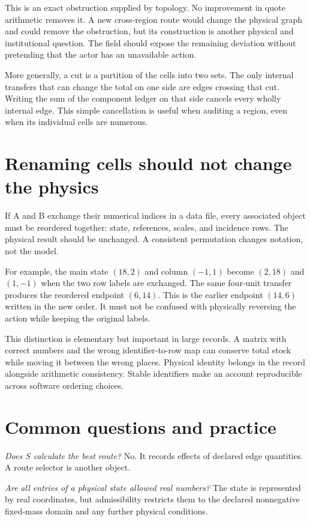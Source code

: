 This is an exact obstruction supplied by topology. No improvement in quote arithmetic removes it. A new cross-region route would change the physical graph and could remove the obstruction, but its construction is another physical and institutional question. The field should expose the remaining deviation without pretending that the actor has an unavailable action.

More generally, a cut is a partition of the cells into two sets. The only internal transfers that can change the total on one side are edges crossing that cut. Writing the sum of the component ledger on that side cancels every wholly internal edge. This simple cancellation is useful when auditing a region, even when its individual cells are numerous.

\section{Renaming cells should not change the physics}
If A and B exchange their numerical indices in a data file, every associated object must be reordered together: state, references, scales, and incidence rows. The physical result should be unchanged. A consistent permutation changes notation, not the model.

For example, the main state \((18,2)\) and column \((-1,1)\) become \((2,18)\) and \((1,-1)\) when the two row labels are exchanged. The same four-unit transfer produces the reordered endpoint \((6,14)\). This is the earlier endpoint \((14,6)\) written in the new order. It must not be confused with physically reversing the action while keeping the original labels.

This distinction is elementary but important in large records. A matrix with correct numbers and the wrong identifier-to-row map can conserve total stock while moving it between the wrong places. Physical identity belongs in the record alongside arithmetic consistency. Stable identifiers make an account reproducible across software ordering choices.

\section{Common questions and practice}
\emph{Does \(S\) calculate the best route?} No. It records effects of declared edge quantities. A route selector is another object.

\emph{Are all entries of a physical state allowed real numbers?} The state is represented by real coordinates, but admissibility restricts them to the declared nonnegative fixed-mass domain and any further physical conditions.

